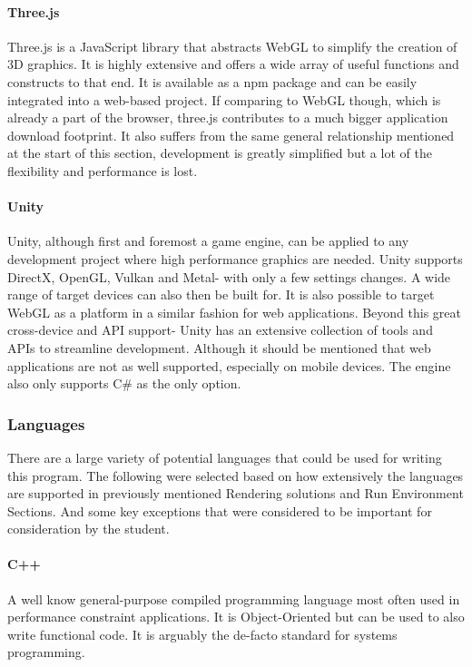 \paragraph{Three.js}
Three.js is a JavaScript library that abstracts WebGL to simplify the creation of 3D graphics. It is highly extensive and offers a wide array of useful functions and constructs to that end. It is available as a npm package and can be easily integrated into a web-based project. If comparing to WebGL though, which is already a part of the browser, three.js contributes to a much bigger application download footprint. It also suffers from the same general relationship mentioned at the start of this section, development is greatly simplified but a lot of the flexibility and performance is lost.

\paragraph{Unity}
Unity, although first and foremost a game engine, can be applied to any development project where high performance graphics are needed. Unity supports DirectX, OpenGL, Vulkan and Metal- with only a few settings changes. A wide range of target devices can also then be built for. It is also possible to target WebGL as a platform in a similar fashion for web applications. Beyond this great cross-device and API support- Unity has an extensive collection of tools and APIs to streamline development. Although it should be mentioned that web applications are not as well supported, especially on mobile devices. The engine also only supports C\# as the only option.

\subsubsection{Languages}
There are a large variety of potential languages that could be used for writing this program. The following were selected based on how extensively the languages are supported in previously mentioned Rendering solutions and Run Environment Sections. And some key exceptions that were considered to be important for consideration by the student.

\paragraph{C++}
A well know general-purpose compiled programming language most often used in performance constraint applications. It is Object-Oriented but can be used to also write functional code. It is arguably the de-facto standard for systems programming.

